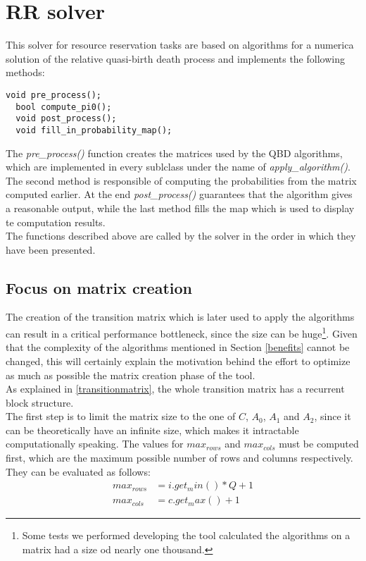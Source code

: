 \section{RR solver}
This solver for resource reservation tasks are based on algorithms for a numerica solution of the relative quasi-birth death process and implements the following methods:
\begin{lstlisting}[frame=bt]
  void pre_process();
  bool compute_pi0();
  void post_process();
  void fill_in_probability_map();
\end{lstlisting}
The \emph{pre\_process()} function creates the matrices used by the QBD algorithms, which are implemented in every sublclass under the name of \emph{apply\_algorithm()}. The second method is responsible of computing the probabilities from the matrix computed earlier. At the end \emph{post\_process()} guarantees that the algorithm gives a reasonable output, while the last method fills the map which is used to display te computation results.\\
The functions described above are called by the solver in the order in which they have been presented.

\subsection{Focus on matrix creation}
The creation of the transition matrix which is later used to apply the algorithms can result in a critical performance bottleneck, since the size can be huge\footnote{Some tests we performed developing the tool calculated the algorithms on a matrix had a size od nearly one thousand.}. Given that the complexity of the algorithms mentioned in Section \ref{benefits} cannot be changed, this will certainly explain the motivation behind the effort to optimize as much as possible the matrix creation phase of the tool.\\
As explained in \ref{transitionmatrix}, the whole transition matrix has a recurrent block structure.\\ 
The first step is to limit the matrix size to the one of \( C \), \( A_{0} \), \( A_{1} \) and \( A_{2} \), since it can be theoretically have an infinite size, which makes it intractable computationally speaking. The values for \( max_{rows} \) and \( max_{cols} \) must be computed first, which are the maximum possible number of rows and columns respectively.\\ 
They can be evaluated as follows: 
\begin{equation*}
\begin{split}
  max_{rows} &= i.get_min() * Q + 1 \\
  max_{cols} &= c.get_max() + 1
\end{split}
\end{equation*}

